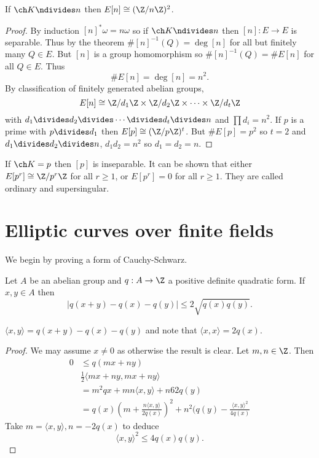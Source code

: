 \documentclass[a4paper]{article}
\theoremstyle{definition}
\begin{document}
\begin{theorem}
  If \(\ch K \ndivides n\) then \(E[n] \cong (\Z/n\Z)^2\).
\end{theorem}

\begin{proof}
  By induction \([n]^*\omega = n\omega\) so if \(\ch K \ndivides n\) then \([n]: E \to E\) is separable. Thus by the theorem \(\# [n]^{-1}(Q) = \deg [n]\) for all but finitely many \(Q \in E\). But \([n]\) is a group homomorphism so \(\#[n]^{-1}(Q) = \# E[n]\) for all \(Q \in E\). Thus
  \[
    \# E[n] = \deg [n] = n^2.
  \]
  By classification of finitely generated abelian groups,
  \[
    E[n] \cong \Z/d_1\Z \times \Z/d_2\Z \times \cdots \times \Z/d_t\Z
  \]
  with \(d_1 \divides d_2 \divides \cdots \divides d_t \divides n\) and \(\prod d_i = n^2\). If \(p\) is a prime with \(p \divides d_1\) then \(E[p] \cong (\Z/p\Z)^t\). But \(\#E[p] = p^2\) so \(t = 2\) and \(d_1 \divides d_2 \divides n\), \(d_1d_2 = n^2\) so \(d_1 = d_2 = n\).
\end{proof}

\begin{remark}
  If \(\ch K = p\) then \([p]\) is inseparable. It can be shown that either \(E[p^r] \cong \Z/p^r\Z\) for all \(r \geq 1\), or \(E[p^r] = 0\) for all \(r \geq 1\). They are called ordinary and supersingular.
\end{remark}

\section{Elliptic curves over finite fields}

We begin by proving a form of Cauchy-Schwarz.

\begin{lemma}
  Let \(A\) be an abelian group and \(q: A \to \Z\) a positive definite quadratic form. If \(x, y \in A\) then
  \[
    |q(x + y) - q(x) - q(y)| \leq 2 \sqrt{q(x) q(y)}.
  \]
\end{lemma}

\begin{notation}
  \(\langle x, y \rangle = q(x + y) - q(x) - q(y)\) and note that \(\langle x, x \rangle = 2q(x)\).
\end{notation}

\begin{proof}
  We may assume \(x \neq 0\) as otherwise the result is clear. Let \(m, n \in \Z\). Then
  \begin{align*}
    0 &\leq q(mx + ny) \\
      & \frac{1}{2} \langle mx + ny, mx + ny \rangle \\
      &= m^2 qx + mn \langle x, y \rangle + n62 q(y) \\
      &= q(x) (m + \frac{n \langle x, y \rangle}{2q(x)})^2 + n^2 (q(y) - \frac{\langle x, y\rangle^2}{4q(x)}
  \end{align*}
  Take \(m = \langle x, y \rangle, n = -2q(x)\) to deduce
  \[
    \langle x, y \rangle^2 \leq 4q(x)q(y).
  \]
\end{proof}
\end{document}
